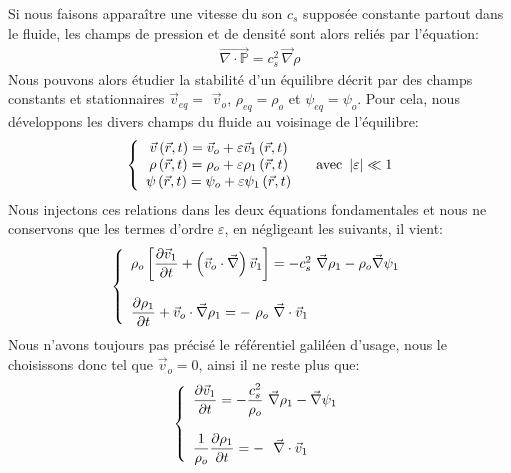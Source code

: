 Si nous faisons apparaître une vitesse du son $c_{s}$ supposée constante partout dans le fluide, les champs de pression et de densité sont alors
reliés par l'équation:
\begin{align*}
	\overrightarrow{\nabla\cdot\mathbb{P}}=c_{s}^{2}\, \vec{\nabla}\rho
\end{align*}
Nous pouvons alors étudier la stabilité d'un équilibre décrit par des champs constants et stationnaires $\vec{v}_{eq}=$ $\vec{v}_{o}$, $\rho_{eq}=\rho_{o}$
et $\psi_{eq}=\psi_{o}$. Pour cela, nous développons les divers champs du fluide au voisinage de l'équilibre:
\begin{align*}
	\left\{
	\begin{array}[c]{c}
		\vec{v}\left(  \vec{r},t\right)  =\vec{v}_{o}+\varepsilon \vec{v}_{1}\left(  \vec{r},t\right)  \\
		\rho\left(  \vec{r},t\right)  =\rho_{o}+\varepsilon\rho_{1}\left( \vec{r},t\right)  \\
		\psi\left(  \vec{r},t\right)  =\psi_{o}+\varepsilon\psi_{1}\left( \vec{r},t\right)
	\end{array}
	\right.  \ \ \ \text{avec }\left\vert \varepsilon\right\vert \ll1
\end{align*}
Nous injectons ces relations dans les deux équations fondamentales et nous ne conservons que les termes d'ordre $\varepsilon$, en négligeant les
suivants, il vient:
\begin{align*}
	\left\{
	\begin{array}[c]{l}
		\rho_{o}\left[  \dfrac{\partial\vec{v}_{1}}{\partial t}+\left( \vec{v}_{o}\cdot\vec{\nabla}\right)  \vec{v}_{1}\right]  =-c_{s}^{2}\ \vec{\nabla}\rho_{1}-\rho_{o}\vec{\nabla}\psi_{1}\\
		\\
		\dfrac{\partial\rho_{1}}{\partial t}+\vec{v}_{o}\cdot\vec{\nabla}\rho_{1}=-\ \rho_{o}\ \vec{\nabla}\cdot\vec{v}_{1}
	\end{array}
	\right.
\end{align*}
Nous n'avons toujours pas précisé le référentiel galiléen d'usage, nous le choisissons donc tel que $\vec{v}_{o}=0$, ainsi il ne reste plus que:
\begin{align*}
	\left\{
	\begin{array}[c]{l}
		\dfrac{\partial\vec{v}_{1}}{\partial t}=-\dfrac{c_{s}^{2}}{\rho_{o}}\ \vec{\nabla}\rho_{1}-\vec{\nabla}\psi_{1}\\
		\\
		\dfrac{1}{\rho_{o}}\dfrac{\partial\rho_{1}}{\partial t}=-\ \ \vec{\nabla}\cdot\vec{v}_{1}
	\end{array}
	\right.
\end{align*}
